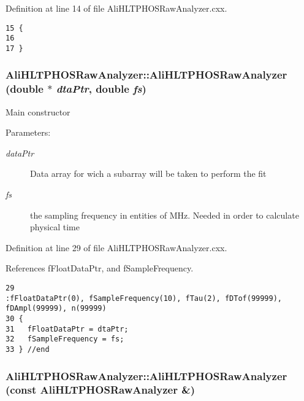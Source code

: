 Definition at line 14 of file Ali\-HLTPHOSRaw\-Analyzer.cxx.

\footnotesize\begin{verbatim}15 {
16 
17 }
\end{verbatim}\normalsize 


\subsubsection{\setlength{\rightskip}{0pt plus 5cm}Ali\-HLTPHOSRaw\-Analyzer::Ali\-HLTPHOSRaw\-Analyzer (double $\ast$ {\em dta\-Ptr}, double {\em fs})}\label{classAliHLTPHOSRawAnalyzer_AliHLTPHOSRawAnalyzera2}


Main constructor \begin{Desc}
\item[Parameters:]
\begin{description}
\item[{\em data\-Ptr}]Data array for wich a subarray will be taken to perform the fit \item[{\em fs}]the sampling frequency in entities of MHz. Needed in order to calculate physical time \end{description}
\end{Desc}


Definition at line 29 of file Ali\-HLTPHOSRaw\-Analyzer.cxx.

References f\-Float\-Data\-Ptr, and f\-Sample\-Frequency.

\footnotesize\begin{verbatim}29                                                                      :fFloatDataPtr(0), fSampleFrequency(10), fTau(2), fDTof(99999), fDAmpl(99999), n(99999)
30 {
31   fFloatDataPtr = dtaPtr;  
32   fSampleFrequency = fs;
33 } //end  
\end{verbatim}\normalsize 


\subsubsection{\setlength{\rightskip}{0pt plus 5cm}Ali\-HLTPHOSRaw\-Analyzer::Ali\-HLTPHOSRaw\-Analyzer (const {\bf Ali\-HLTPHOSRaw\-Analyzer} \&)}\label{classAliHLTPHOSRawAnalyzer_AliHLTPHOSRawAnalyzera3}




